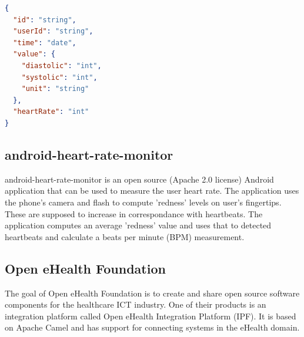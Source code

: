 

\begin{lstlisting}[language=JSON]
{
  "id": "string",
  "userId": "string",
  "time": "date",
  "value": {
    "diastolic": "int",
    "systolic": "int",
    "unit": "string"
  },
  "heartRate": "int"
}
\end{lstlisting}

\subsection{android-heart-rate-monitor} \nocite{AndroidHeartRateMonitor}
\label{subsec:hr}

android-heart-rate-monitor is an open source (Apache 2.0 license) Android application that can be used
to measure the user heart rate. The application uses the phone's camera and flash to compute
'redness' levels on user's fingertips. These are supposed to increase in correspondance with heartbeats.
The application computes an average 'redness' value and uses that to detected heartbeats and calculate
a beats per minute (BPM) measurement.


\subsection{Open eHealth Foundation} \nocite{OpenEHealthFoundation}

The goal of Open eHealth Foundation is to create and share open source software components for the healthcare ICT industry.
One of their products is an integration platform called Open eHealth Integration Platform (IPF).
It is based on Apache Camel and has support for connecting systems in the eHealth domain.


